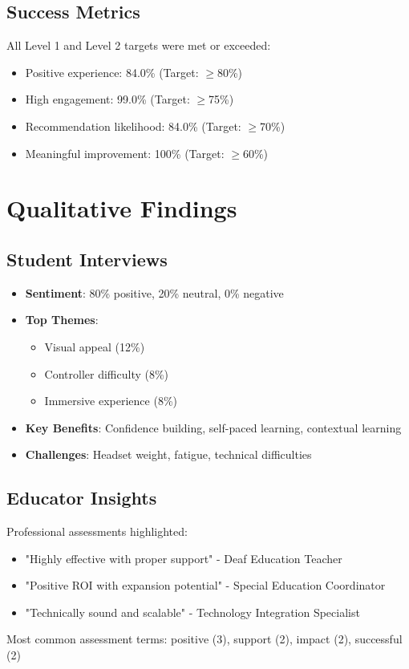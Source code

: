 \documentclass{article}
\begin{document}
\subsection{Success Metrics}
All Level 1 and Level 2 targets were met or exceeded:
\begin{itemize}
    \item Positive experience: 84.0\% (Target: $\geq$80\%)
    \item High engagement: 99.0\% (Target: $\geq$75\%)
    \item Recommendation likelihood: 84.0\% (Target: $\geq$70\%)
    \item Meaningful improvement: 100\% (Target: $\geq$60\%)
\end{itemize}

\section{Qualitative Findings}
\subsection{Student Interviews}
\begin{itemize}
    \item \textbf{Sentiment}: 80\% positive, 20\% neutral, 0\% negative
    \item \textbf{Top Themes}: 
    \begin{itemize}
        \item Visual appeal (12\%)
        \item Controller difficulty (8\%)
        \item Immersive experience (8\%)
    \end{itemize}
    \item \textbf{Key Benefits}: Confidence building, self-paced learning, contextual learning
    \item \textbf{Challenges}: Headset weight, fatigue, technical difficulties
\end{itemize}

\subsection{Educator Insights}
Professional assessments highlighted:
\begin{itemize}
    \item "Highly effective with proper support" - Deaf Education Teacher
    \item "Positive ROI with expansion potential" - Special Education Coordinator
    \item "Technically sound and scalable" - Technology Integration Specialist
\end{itemize}
Most common assessment terms: positive (3), support (2), impact (2), successful (2)
\end{document}

